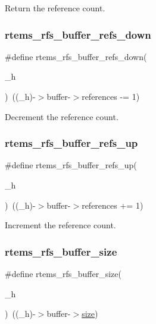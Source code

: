 Return the reference count. \mbox{\label{rtems-rfs-buffer_8h_a5dedbca1ff6273273639eae1353f7447}} 
\subsubsection{\texorpdfstring{rtems\_rfs\_buffer\_refs\_down}{rtems\_rfs\_buffer\_refs\_down}}
{\footnotesize\ttfamily \#define rtems\+\_\+rfs\+\_\+buffer\+\_\+refs\+\_\+down(\begin{DoxyParamCaption}\item[{}]{\+\_\+h }\end{DoxyParamCaption})~((\+\_\+h)-\/$>$buffer-\/$>$references -\/= 1)}

Decrement the reference count. \mbox{\label{rtems-rfs-buffer_8h_ab7a683a0d8d62ca1dcad8bc715cdcef2}} 
\subsubsection{\texorpdfstring{rtems\_rfs\_buffer\_refs\_up}{rtems\_rfs\_buffer\_refs\_up}}
{\footnotesize\ttfamily \#define rtems\+\_\+rfs\+\_\+buffer\+\_\+refs\+\_\+up(\begin{DoxyParamCaption}\item[{}]{\+\_\+h }\end{DoxyParamCaption})~((\+\_\+h)-\/$>$buffer-\/$>$references += 1)}

Increment the reference count. \mbox{\label{rtems-rfs-buffer_8h_a61b3830c7a42a4f4eeacf65415083e36}} 
\subsubsection{\texorpdfstring{rtems\_rfs\_buffer\_size}{rtems\_rfs\_buffer\_size}}
{\footnotesize\ttfamily \#define rtems\+\_\+rfs\+\_\+buffer\+\_\+size(\begin{DoxyParamCaption}\item[{}]{\+\_\+h }\end{DoxyParamCaption})~((\+\_\+h)-\/$>$buffer-\/$>$\mbox{\hyperlink{sun4u_2tte_8h_a245260f6f74972558f61b85227df5aae}{size}})}

